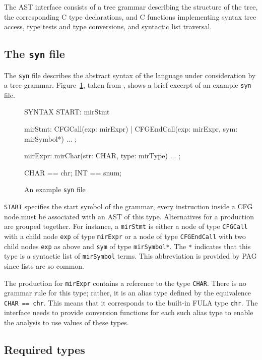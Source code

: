 \documentclass[12pt]{article}
\begin{document}
The AST interface consists of a tree grammar describing the
structure of the tree, the corresponding C type declarations, and C
functions implementing syntax tree access, type tests and type
conversions, and syntactic list traversal.

\subsection{The {\tt syn} file}

The \verb|syn| file describes the abstract syntax of the language
under consideration by a tree grammar. Figure~\ref{syn}, taken from
\cite{pag}, shows a brief excerpt of an example \verb|syn| file.

\begin{figure}
    \centering
    \begin{boxedverbatim}
SYNTAX
START: mirStmt

mirStmt: CFGCall(exp: mirExpr)
       | CFGEndCall(exp: mirExpr, sym: mirSymbol*)
         ...
       ;

mirExpr: mirChar(str: CHAR, type: mirType)
         ...
       ;

CHAR == chr;
INT  == snum;\end{boxedverbatim}
    \caption{An example {\tt syn} file}
    \label{syn}
\end{figure}

\verb|START| specifies the start symbol of the grammar, every
instruction inside a CFG node must be associated with an AST of this
type. Alternatives for a production are grouped together. For
instance, a \verb|mirStmt| is either a node of type \verb|CFGCall|
with a child node \verb|exp| of type \verb|mirExpr| or a node of
type \verb|CFGEndCall| with two child nodes \verb|exp| as above and
\verb|sym| of type \verb|mirSymbol*|. The \verb|*| indicates that
this type is a syntactic list of \verb|mirSymbol| terms. This
abbreviation is provided by PAG since lists are so common.

The production for \verb|mirExpr| contains a reference to the type
\verb|CHAR|. There is no grammar rule for this type; rather, it is
an alias type defined by the equivalence \verb|CHAR == chr|. This
means that it corresponds to the built-in FULA type \verb|chr|. The
interface needs to provide conversion functions for each such
alias type to enable the analysis to use values of these types.

\subsection{Required types}
\end{document}
